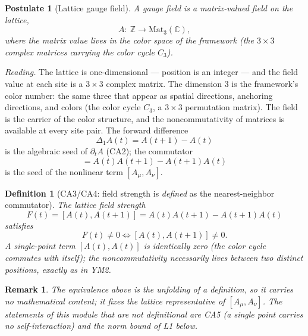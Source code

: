 \documentclass[aps,prd,preprint,superscriptaddress,amsmath,amssymb]{revtex4-2}
\newtheorem{postulate}{Postulate}[section]
\newtheorem{definition}{Definition}[section]
\newtheorem{remark}{Remark}[section]
\begin{document}
\begin{postulate}[Lattice gauge field]
\label{post:lattice}
A gauge field is a matrix-valued field on the lattice,
\begin{equation}
A:\ \mathbb{Z}\to \mathrm{Mat}_3(\mathbb{C}),
\end{equation}
where the matrix value lives in the color space of the framework
(the $3\times3$ complex matrices carrying the color cycle $C_3$).
\end{postulate}

\emph{Reading.}  The lattice is one-dimensional --- position is an
integer --- and the field value at each site is a $3\times3$ complex
matrix.  The dimension $3$ is the framework's color number: the same
three that appear as spatial directions, anchoring directions, and
colors (the color cycle $C_3$, a $3\times3$ permutation matrix).
The field is the carrier of the color structure, and the
noncommutativity of matrices is available at every site pair.  The
forward difference
\begin{equation}
\Delta_1 A(t)=A(t{+}1)-A(t)
\label{eq:grad}
\end{equation}
is the algebraic seed of $\partial_t A$ (CA2); the commutator
\begin{equation}
[A(t),A(t{+}1)]=A(t)A(t{+}1)-A(t{+}1)A(t)
\end{equation}
is the seed of the nonlinear term $[A_\mu,A_\nu]$.

\begin{definition}[CA3/CA4: field strength is \emph{defined} as the nearest-neighbor commutator]
\label{thm:ca3}
The lattice field strength
\begin{equation}
F(t) = [A(t),A(t{+}1)] = A(t)A(t{+}1)-A(t{+}1)A(t)
\end{equation}
satisfies
\begin{equation}
F(t)\neq 0 \iff [A(t),A(t{+}1)]\neq 0 .
\end{equation}
A single-point term $[A(t),A(t)]$ is identically zero (the color
cycle commutes with itself); the noncommutativity necessarily lives
between two distinct positions, exactly as in YM2.
\end{definition}

\begin{remark}
The equivalence above is the unfolding of a definition, so it carries no
mathematical content; it fixes the lattice representative of
$[A_\mu,A_\nu]$.  The statements of this module that are \emph{not}
definitional are CA5 (a single point carries no self-interaction) and the
norm bound of L1 below.
\end{remark}
\end{document}
